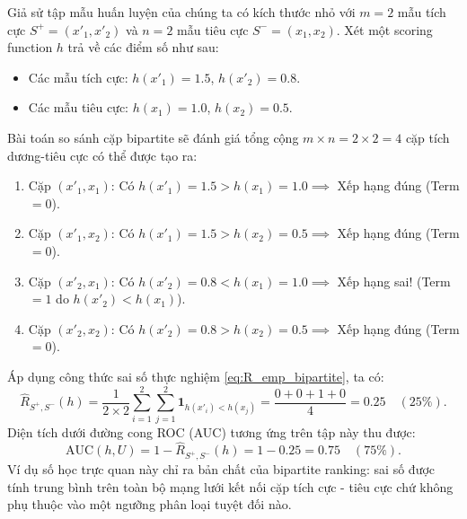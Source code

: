 \begin{example}
Giả sử tập mẫu huấn luyện của chúng ta có kích thước nhỏ với $m = 2$ mẫu tích cực $S^+ = (x'_1, x'_2)$ và $n = 2$ mẫu tiêu cực $S^- = (x_1, x_2)$. Xét một scoring function $h$ trả về các điểm số như sau:
\begin{itemize}
    \item Các mẫu tích cực: $h(x'_1) = 1.5$, $h(x'_2) = 0.8$.
    \item Các mẫu tiêu cực: $h(x_1) = 1.0$, $h(x_2) = 0.5$.
\end{itemize}

Bài toán so sánh cặp bipartite sẽ đánh giá tổng cộng $m \times n = 2 \times 2 = 4$ cặp tích dương-tiêu cực có thể được tạo ra:
\begin{enumerate}
    \item Cặp $(x'_1, x_1)$: Có $h(x'_1) = 1.5 > h(x_1) = 1.0 \implies$ Xếp hạng đúng (Term $= 0$).
    \item Cặp $(x'_1, x_2)$: Có $h(x'_1) = 1.5 > h(x_2) = 0.5 \implies$ Xếp hạng đúng (Term $= 0$).
    \item Cặp $(x'_2, x_1)$: Có $h(x'_2) = 0.8 < h(x_1) = 1.0 \implies$ Xếp hạng sai! (Term $= 1$ do $h(x'_2) < h(x_1)$).
    \item Cặp $(x'_2, x_2)$: Có $h(x'_2) = 0.8 > h(x_2) = 0.5 \implies$ Xếp hạng đúng (Term $= 0$).
\end{enumerate}

Áp dụng công thức sai số thực nghiệm \eqref{eq:R_emp_bipartite}, ta có:
\[
    \hat{R}_{S^+, S^-}(h) = \frac{1}{2 \times 2} \sum_{i=1}^2 \sum_{j=1}^2 \mathbf{1}_{h(x'_i) < h(x_j)} = \frac{0 + 0 + 1 + 0}{4} = 0.25 \quad (25\%).
\]
Diện tích dưới đường cong ROC (AUC) tương ứng trên tập này thu được:
\[
    \mathrm{AUC}(h, U) = 1 - \hat{R}_{S^+, S^-}(h) = 1 - 0.25 = 0.75 \quad (75\%).
\]
Ví dụ số học trực quan này chỉ ra bản chất của bipartite ranking: sai số được tính trung bình trên toàn bộ mạng lưới kết nối cặp tích cực - tiêu cực chứ không phụ thuộc vào một ngưỡng phân loại tuyệt đối nào.
\end{example}

